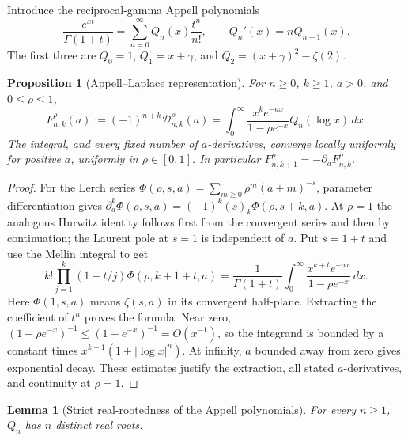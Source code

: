 \documentclass[11pt,a4paper]{article}
\newtheorem{lemma}[theorem]{Lemma}
\newtheorem{proposition}[theorem]{Proposition}
\theoremstyle{definition}
\theoremstyle{remark}
\numberwithin{equation}{section}
\begin{document}
Introduce the reciprocal-gamma Appell polynomials
\begin{equation}\label{lerchboundary:eq:Q-background}
 \frac{e^{xt}}{\Gamma(1+t)}
 =\sum_{n=0}^{\infty}Q_n(x)\frac{t^n}{n!},
 \qquad Q_n'(x)=nQ_{n-1}(x).
\end{equation}
The first three are $Q_0=1$, $Q_1=x+\gamma$, and
$Q_2=(x+\gamma)^2-\zeta(2)$.

\begin{proposition}[Appell--Laplace representation]
\label{lerchboundary:prop:laplace-background}
For $n\geq0$, $k\geq1$, $a>0$, and $0\leq\rho\leq1$,
\begin{equation}\label{lerchboundary:eq:laplace-background}
 F_{n,k}^{\rho}(a):=(-1)^{n+k}\mathcal D_{n,k}^{\rho}(a)
 =\int_0^\infty
   \frac{x^k e^{-ax}}{1-\rho e^{-x}}Q_n(\log x)\,dx.
\end{equation}
The integral, and every fixed number of $a$-derivatives, converge
locally uniformly for positive $a$, uniformly in $\rho\in[0,1]$.
In particular $F_{n,k+1}^{\rho}=-\partial_aF_{n,k}^{\rho}$.
\end{proposition}

\begin{proof}
For the Lerch series
$\Phi(\rho,s,a)=\sum_{m\geq0}\rho^m(a+m)^{-s}$,
parameter differentiation gives
$\partial_a^k\Phi(\rho,s,a)=(-1)^k(s)_k\Phi(\rho,s+k,a)$.
At $\rho=1$ the analogous Hurwitz identity follows first from the
convergent series and then by continuation; the Laurent pole at $s=1$
is independent of $a$. Put $s=1+t$ and use the Mellin integral to get
\[
 k!\prod_{j=1}^k(1+t/j)\Phi(\rho,k+1+t,a)
 =\frac1{\Gamma(1+t)}\int_0^\infty
        \frac{x^{k+t}e^{-ax}}{1-\rho e^{-x}}\,dx.
\]
Here $\Phi(1,s,a)$ means $\zeta(s,a)$ in its convergent half-plane.
Extracting the coefficient of $t^n$ proves the formula. Near zero,
$(1-\rho e^{-x})^{-1}\leq(1-e^{-x})^{-1}=O(x^{-1})$,
so the integrand is bounded by a constant times
$x^{k-1}(1+|\log x|^n)$. At infinity, $a$ bounded away from zero
gives exponential decay. These estimates justify the extraction,
all stated $a$-derivatives, and continuity at $\rho=1$.
\end{proof}

\begin{lemma}[Strict real-rootedness of the Appell polynomials]
\label{lerchboundary:lem:Q-roots-background}
For every $n\geq1$, $Q_n$ has $n$ distinct real roots.
\end{lemma}
\end{document}
